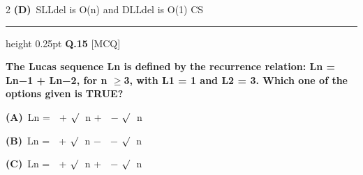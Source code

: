 \documentclass[a4paper,10pt,twoside]{article}
\begin{document}
\begin{multicols}{2}
\textbf{(D)}~SLLdel is O(n) and DLLdel is O(1) \newline CS
\par\vspace{6pt}\hrule height 0.25pt\vspace{6pt}
\noindent\textbf{Q.15} \hfill {\footnotesize\textsf{[MCQ]}}
\par\vspace{2pt}
{\bfseries The Lucas sequence Ln is deﬁned by the recurrence relation:
Ln = Ln−1 + Ln−2,
for
n $\ge$3,
with L1 = 1 and L2 = 3.
Which one of the options given is TRUE? \par}
\par\vspace{2pt}\noindent
\textbf{(A)}~Ln = \newline   + \newline $\sqrt{\vphantom{x}}$   \newline n \newline + \newline   − \newline $\sqrt{\vphantom{x}}$   \newline n\par\vspace{2pt}\noindent
\textbf{(B)}~Ln = \newline   + \newline $\sqrt{\vphantom{x}}$   \newline n \newline − \newline   − \newline $\sqrt{\vphantom{x}}$   \newline n\par\vspace{2pt}\noindent
\textbf{(C)}~Ln = \newline   + \newline $\sqrt{\vphantom{x}}$   \newline n \newline + \newline   − \newline $\sqrt{\vphantom{x}}$   \newline n\par\vspace{2pt}\noindent

\end{multicols}
\end{document}
